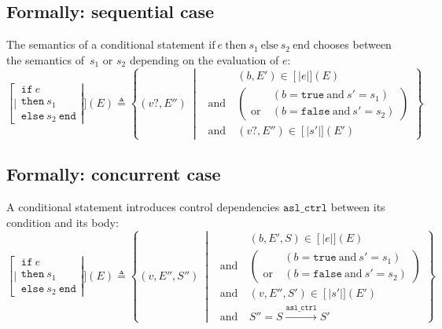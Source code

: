 \documentclass{book}
\newcommand\syntt[1]{\mathtt{#1}}
\newcommand\ife[3]{\text{if}\ #1\ \text{then}\ #2\ \text{else}\ #3\ \text{end}}
\newcommand\llbracket{[|}
\newcommand\rrbracket{|]}
\newcommand\interp[1]{\left\llbracket #1 \right\rrbracket}
\newcommand\st[0]{\ \middle|\ }
\newcommand\aslctrl[0]{\mathtt{asl\_ctrl}}
\begin{document}
  \subsection{Formally: sequential case}
  The semantics of a conditional statement $\ife{e}{s_1}{s_2}$ chooses between
  the semantics of~$s_1$ or $s_2$ depending on the evaluation of $e$:
  \begin{equation}
    \interp{\begin{array}{l}
      \syntt{if}\ e\\
      \syntt{then}\ s_1\\
      \syntt{else}\ s_2\ \syntt{end}
    \end{array}} (E) \triangleq
      \left\{ (v?, E'') \st{} \ 
      \begin{aligned}
        & (b, E') \in \interp{e} (E)
        \\ \text{and}\ &
        \left( \begin{aligned}
          & \left(b = \syntt{true} \ \text{and} \ s' = s_1 \right)
          \\ \text{or}\ &
          \left( b = \syntt{false} \ \text{and}\ s' = s_2 \right)
        \end{aligned} \right)
        \\ \text{and}\ &
        (v?, E'') \in \interp{s'} (E')
      \end{aligned}
      \right\}
    \label{eq:sem-seq-scond}
  \end{equation}

  \subsection{Formally: concurrent case}
  A conditional statement introduces control dependencies $\aslctrl$ between its
  condition and its body:
  \begin{equation}
    \interp{\begin{array}{l}
      \syntt{if}\ e\\
      \syntt{then}\ s_1\\
      \syntt{else}\ s_2\ \syntt{end}
    \end{array}} (E) \triangleq
      \left\{ (v, E'', S'') \st{} \ 
      \begin{aligned}
        & (b, E', S) \in \interp{e} (E)
        \\ \text{and}\ &
        \left( \begin{aligned}
          & \left(b = \syntt{true}\ \text{and}\ s' = s_1 \right)
          \\ \text{or}\ &
          \left( b = \syntt{false}\ \text{and}\ s' = s_2 \right)
        \end{aligned} \right)
        \\ \text{and}\ &
        (v, E'', S') \in \interp{s'} (E')
        \\ \text{and}\ &
        S'' = S \xrightarrow{\aslctrl} S'
      \end{aligned}
      \right\}
    \label{eq:sem-conc-scond}
  \end{equation}
\end{document}
